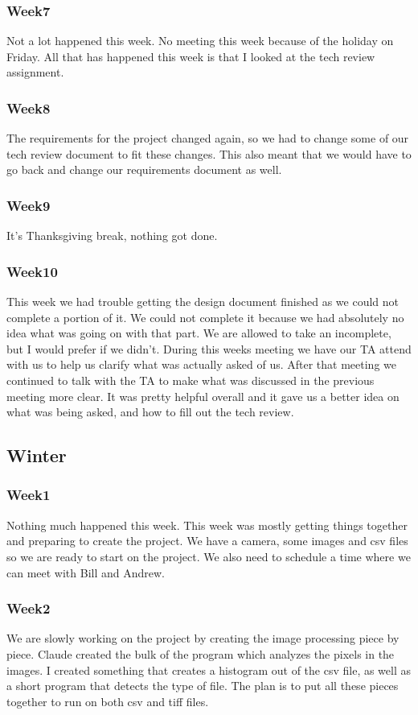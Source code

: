 	\subsubsection*{Week7}
		Not a lot happened this week. No meeting this week because of the holiday on Friday. All that has happened this week is that I looked at the tech review assignment. 
	\subsubsection*{Week8}
		The requirements for the project changed again, so we had to change some of our tech review document to fit these changes. This also meant that we would have to go back and change our requirements document as well.
	\subsubsection*{Week9}
		It's Thanksgiving break, nothing got done.
	\subsubsection*{Week10}
		This week we had trouble getting the design document finished as we could not complete a portion of it. We could not complete it because we had absolutely no idea what was going on with that part. We are allowed to take an incomplete, but I would prefer if we didn't. During this weeks meeting we have our TA attend with us to help us clarify what was actually asked of us. After that meeting we continued to talk with the TA to make what was discussed in the previous meeting more clear. It was pretty helpful overall and it gave us a better idea on what was being asked, and how to fill out the tech review.
\subsection*{Winter}
	\subsubsection*{Week1}
		Nothing much happened this week. This week was mostly getting things together and preparing to create the project. We have a camera, some images and csv files so we are ready to start on the project. We also need to schedule a time where we can meet with Bill and Andrew.
	\subsubsection*{Week2}
		We are slowly working on the project by creating the image processing piece by piece. Claude created the bulk of the program which analyzes the pixels in the images. I created something that creates a histogram out of the csv file, as well as a short program that detects the type of file. The plan is to put all these pieces together to run on both csv and tiff files.
